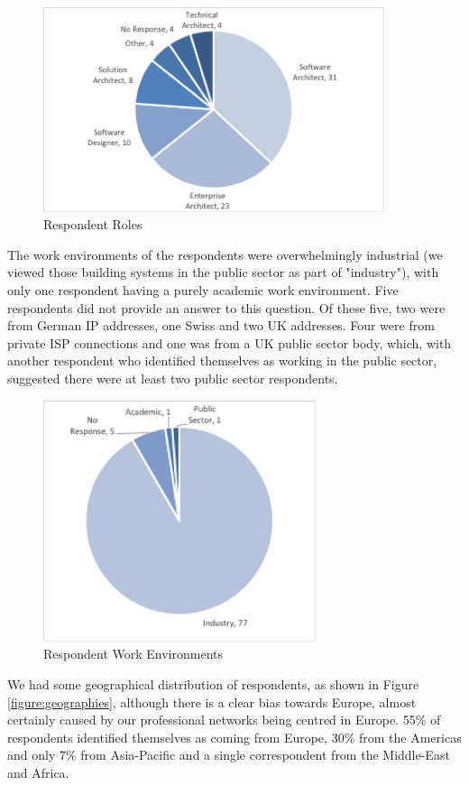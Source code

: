 \begin{figure}
\centering
\includegraphics[width=10cm,trim={2 2 2 2},clip]{Figures/prioritisation-detailed-roles}
\caption{Respondent Roles}
\label{figure:resproles}
\end{figure}


The work environments of the respondents were overwhelmingly industrial (we viewed those building systems in the public sector as part of "industry"), with only one respondent having a purely academic work environment.  Five respondents did not provide an answer to this question.  Of these five, two were from German IP addresses, one Swiss and two UK addresses.  Four were from private ISP connections and one was from a UK public sector body, which, with another respondent who identified themselves as working in the public sector, suggested there were at least two public sector respondents.
 
\begin{figure}
\centering
\includegraphics[width=8cm,trim={2 2 2 2},clip]{Figures/prioritisation-workenv}
\caption{Respondent Work Environments}
\label{figure:workenvs}
\end{figure}

We had some geographical distribution of respondents, as shown in Figure \ref{figure:geographies}, although there is a clear bias towards Europe, almost certainly caused by our professional networks being centred in Europe.  55\% of respondents identified themselves as coming from Europe, 30\% from the Americas and only 7\% from Asia-Pacific and a single correspondent from the Middle-East and Africa.

